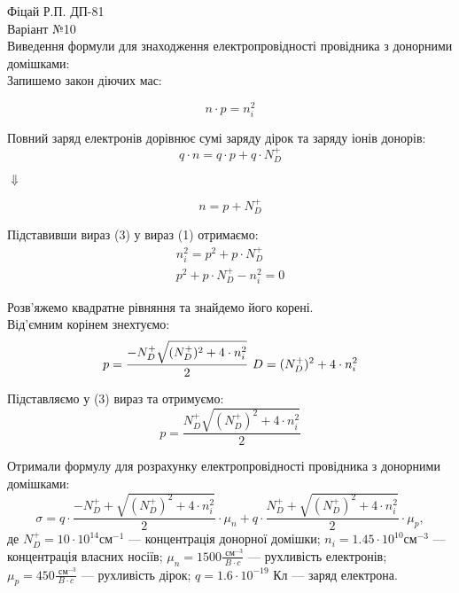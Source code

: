 \documentclass[a4paper,12pt]{article}
\begin{document}
\pagecolor{white}
Фіцай Р.П. ДП-81\\

Варіант №10\\

Виведення формули для знаходження електропровідності провідника з донорними домішками:\\

\large
Запишемо закон діючих мас:

\begin{equation}
n\cdot p = n_i^2
\label{eq:ref}
\end{equation}

Повний заряд електронів дорівнює сумі заряду дірок та заряду іонів донорів:
\begin{equation}
 q\cdot n = q\cdot p + q\cdot N_D^+ 
\label{eq:ref}
\end{equation}
\begin{center}
$ \Downarrow$\\
\end{center}
\begin{equation}
n = p + N_D^+
\label{eq:ref}
\end{equation}


Підставивши вираз (3) у вираз (1) отримаємо:
\begin{align}
 n_i^2 = p^2 + p\cdot N_D^+\\
 p^2 + p\cdot N_D^+ -n_i^2 = 0
\end{align}


Розв'яжемо квадратне рівняння та знайдемо його корені.\\

Від'ємним корінем знехтуємо:
\begin{equation}
p = \dfrac {-N_D^+ \sqrt{(N_D^+)^2 + 4\cdot n_i^2}}{2}\text{   } D = (N_D^+)^2 + 4\cdot n_i^2\\
\label{eq:ref}
\end{equation}

Підставляємо у (3) вираз та отримуємо:\\
\begin{equation}
p = \dfrac {N_D^+ \sqrt{(N_D^+)^2 + 4\cdot n_i^2}}{2}
 \end{equation}
 
 Отримали формулу для розрахунку електропровідності провідника з донорними домішками:\\
 \begin{equation}
\sigma =  q\cdot \dfrac {-N_D^+ +\sqrt{(N_D^+)^2 + 4\cdot n_i^2}}{2} \cdot \mu_n + q\cdot \dfrac {N_D^+ +\sqrt{(N_D^+)^2 + 4\cdot n_i^2}}{2} \cdot \mu_p,
 \end{equation}
 де $N_D^+ = 10\cdot 10^{14}\text{$\text{см}^{-1}$}$ --- концентрація донорної домішки; 
 $n_i = 1.45\cdot 10^{10}\text{$\text{см}^{-3}$}$ --- концентрація власних носіїв; 
 $\mu_n = 1500 \frac{\text{$\text{ см}^{-3}$}}{B\cdot c}$ --- рухливість електронів; 
 $\mu_p = 450\frac{\text{$\text{ см}^{-3}$}}{B\cdot c}$ --- рухливість дірок; 
 $q=1.6\cdot10^{-19} \text{ Кл}$ --- заряд електрона. 
 \vspace{1cm}
\end{document}
